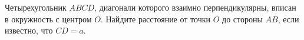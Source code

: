 \begin{ex}
	\begin{condition}
		Четырехугольник \( ABCD \), диагонали которого взаимно перпендикулярны, вписан в окружность с центром \( O \). Найдите расстояние от точки \( O  \) до стороны \( AB \), если известно,	что \( CD = a \).
	\end{condition}
\end{ex}